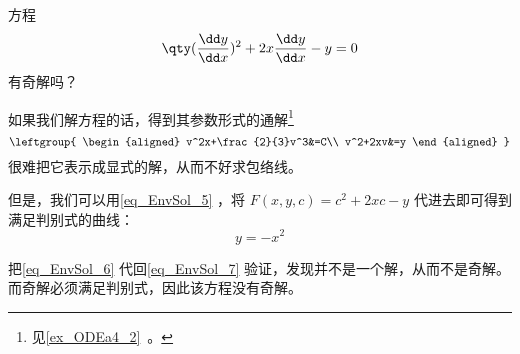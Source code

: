 \begin{example}{}
方程
\begin{equation}\label{eq_EnvSol_7}
\qty(\frac{\dd y}{\dd x})^2+2x\frac{\dd y}{\dd x}-y=0
\end{equation}
有奇解吗？

如果我们解方程的话，得到其参数形式的通解\footnote{见\autoref{ex_ODEa4_2}~。}
\begin{equation}
\leftgroup{
    \begin{aligned}
    v^2x+\frac{2}{3}v^3&=C\\
    v^2+2xv&=y
    \end{aligned}
}
\end{equation}
很难把它表示成显式的解，从而不好求包络线。

但是，我们可以用\autoref{eq_EnvSol_5} ，将 $F(x, y, c)=c^2+2xc-y$ 代进去即可得到满足判别式的曲线：
\begin{equation}\label{eq_EnvSol_6}
y=-x^2
\end{equation}

把\autoref{eq_EnvSol_6} 代回\autoref{eq_EnvSol_7} 验证，发现并不是一个解，从而不是奇解。而奇解必须满足判别式，因此该方程没有奇解。

\end{example}























